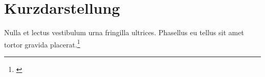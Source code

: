 \chapter*{Kurzdarstellung}
\lipsum[1]
Nulla et lectus vestibulum urna fringilla ultrices. Phasellus eu tellus sit amet tortor gravida placerat.\footnote{\cite{stroetmann:97}}
\lipsum[1]